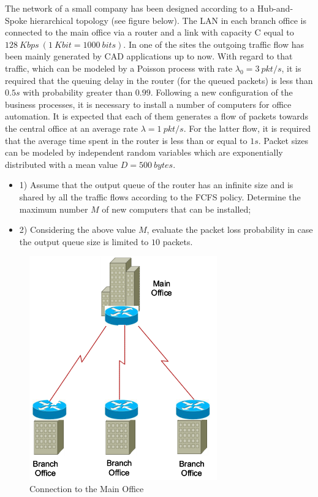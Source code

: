 The network of a small company has been designed according to a Hub-and-Spoke hierarchical topology (see figure below). The LAN in each branch office is connected to the main office via a router and a link with capacity C equal to $128\ Kbps\ (1\ Kbit = 1000\ bits)$. In one of the sites the outgoing traffic flow has been mainly generated by CAD applications up to now. With regard to that traffic, which can be modeled by a Poisson process with rate $\lambda_0=3\ pkt/s$, it is required that the queuing delay in the  router (for the queued packets) is less than $0.5s$ with probability greater than $0.99$.  Following a new configuration of the business processes, it is necessary to install a number of computers for office automation. It is expected that each of them generates a flow of packets towards the central office at an average rate $\lambda=1\ pkt/s$. For the latter flow, it is required that the average time spent in the router is less than or equal to $1s$.  Packet sizes can be modeled by independent random variables which are exponentially distributed with a mean value $D=500\ bytes$. 

\begin{itemize}

\item{1)} Assume that the output queue of the router has an infinite size and is shared by all the traffic flows according to the FCFS policy. Determine the maximum number $M$ of new computers that  can be installed;
\item{2)} Considering the above value $M$, evaluate the packet loss probability in case the output queue size is limited to $10$ packets.

\end{itemize}

\begin{figure}[H]
\centering
\includegraphics[scale=1]{figures/ex/cmo.png}
\caption{Connection to the Main Office}
\end{figure}

